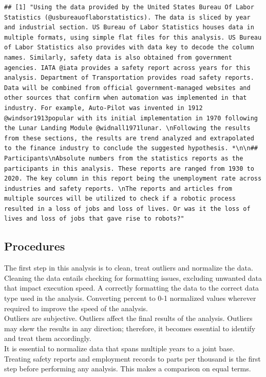 \documentclass[
  man,floatsintext]{apa7}
\begin{document}
\begin{verbatim}
## [1] "Using the data provided by the United States Bureau Of Labor Statistics (@usbureauoflaborstatistics). The data is sliced by year and industrial section. US Bureau of Labor Statistics houses data in multiple formats, using simple flat files for this analysis. US Bureau of Labor Statistics also provides with data key to decode the column names. Similarly, safety data is also obtained from government agencies. IATA @iata provides a safety report across years for this analysis. Department of Transportation provides road safety reports. Data will be combined from official government-managed websites and other sources that confirm when automation was implemented in that industry. For example, Auto-Pilot was invented in 1912 @windsor1913popular with its initial implementation in 1970 following the Lunar Landing Module @widnall1971lunar. \nFollowing the results from these sections, the results are trend analyzed and extrapolated to the finance industry to conclude the suggested hypothesis. *\n\n## Participants\nAbsolute numbers from the statistics reports as the participants in this analysis. These reports are ranged from 1930 to 2020. The key column in this report being the unemployment rate across industries and safety reports. \nThe reports and articles from multiple sources will be utilized to check if a robotic process resulted in a loss of jobs and loss of lives. Or was it the loss of lives and loss of jobs that gave rise to robots?"
\end{verbatim}

\hypertarget{procedures}{%
\subsection{Procedures}\label{procedures}}

The first step in this analysis is to clean, treat outliers and normalize the data. Cleaning the data entails checking for formatting issues, excluding unwanted data that impact execution speed. A correctly formatting the data to the correct data type used in the analysis. Converting percent to 0-1 normalized values wherever required to improve the speed of the analysis.\\

Outliers are subjective. Outliers affect the final results of the analysis. Outliers may skew the results in any direction; therefore, it becomes essential to identify and treat them accordingly.\\
It is essential to normalize data that spans multiple years to a joint base. Treating safety reports and employment records to parts per thousand is the first step before performing any analysis. This makes a comparison on equal terms.\\
\end{document}
